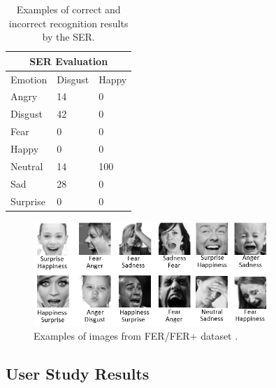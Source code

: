 \begin{table}[htpb]
\centering
\begin{tabular}{|l|l|l|}
\hline
\multicolumn{3}{|c|}{SER Evaluation} \\ \hline
Emotion      & Disgust    & Happy    \\ \hline
Angry        & 14         & 0        \\ \hline
Disgust      & 42         & 0        \\ \hline
Fear         & 0          & 0        \\ \hline
Happy        & 0          & 0        \\ \hline
Neutral      & 14         & 100      \\ \hline
Sad          & 28         & 0        \\ \hline
Surprise     & 0          & 0        \\ \hline
\end{tabular}
\caption{Examples of correct and incorrect recognition results by the SER.}
\label{table:serexp}
\end{table}

\begin{figure}[htpb]
  \centering
  \includegraphics[width=0.8\textwidth]{figures/fer.png}
  \caption{Examples of images from FER/FER+ dataset \parencite{BarsoumICMI2016}.} \label{fig:fer}
\end{figure}


\subsection{User Study Results}

